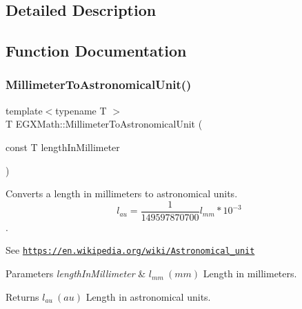 \subsection{Detailed Description}


\subsection{Function Documentation}
\mbox{\label{group___e_g_x_math-_conversions-_length_conversions-_millimeter-_astronomical_ga1ebdde429def9d2f19771a8847f9cfb5}} 
\subsubsection{\texorpdfstring{Millimeter\+To\+Astronomical\+Unit()}{MillimeterToAstronomicalUnit()}}
{\footnotesize\ttfamily template$<$typename T $>$ \\
T E\+G\+X\+Math\+::\+Millimeter\+To\+Astronomical\+Unit (\begin{DoxyParamCaption}\item[{const T}]{length\+In\+Millimeter }\end{DoxyParamCaption})}



Converts a length in millimeters to astronomical units. \[ l_{au}= \frac{1}{149597870700} l_{mm} * 10^{-3} \]. 

See \href{https://en.wikipedia.org/wiki/Astronomical_unit}{\tt https\+://en.\+wikipedia.\+org/wiki/\+Astronomical\+\_\+unit} 
\begin{DoxyParams}{Parameters}
{\em length\+In\+Millimeter} & $ l_{mm}\ (mm)$ Length in millimeters. \\
\hline
\end{DoxyParams}
\begin{DoxyReturn}{Returns}
$ l_{au}\ (au)$ Length in astronomical units. 
\end{DoxyReturn}
\mbox{\label{group___e_g_x_math-_conversions-_length_conversions-_millimeter-_astronomical_gaca60b964c53d123506847dd98ba8a00b}} 
